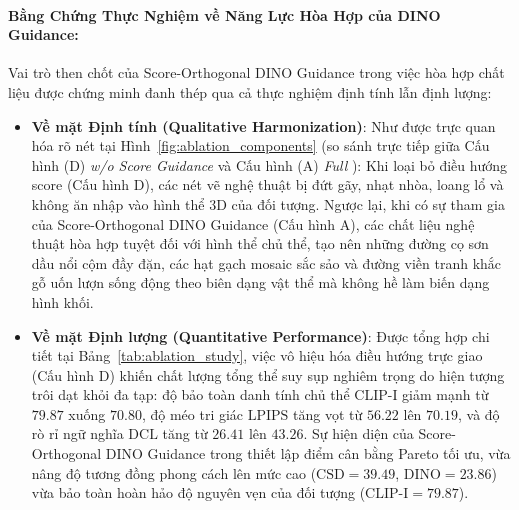 \documentclass[runningheads]{llncs}
\begin{document}
\paragraph{Bằng Chứng Thực Nghiệm về Năng Lực Hòa Hợp của DINO Guidance:}
Vai trò then chốt của Score-Orthogonal DINO Guidance trong việc hòa hợp chất liệu được chứng minh đanh thép qua cả thực nghiệm định tính lẫn định lượng:
\begin{itemize}
    \item \textbf{Về mặt Định tính (Qualitative Harmonization)}: Như được trực quan hóa rõ nét tại Hình~\ref{fig:ablation_components} (so sánh trực tiếp giữa Cấu hình (D) \textit{w/o Score Guidance} và Cấu hình (A) \textit{Full \method}): Khi loại bỏ điều hướng score (Cấu hình D), các nét vẽ nghệ thuật bị đứt gãy, nhạt nhòa, loang lổ và không ăn nhập vào hình thể 3D của đối tượng. Ngược lại, khi có sự tham gia của Score-Orthogonal DINO Guidance (Cấu hình A), các chất liệu nghệ thuật hòa hợp tuyệt đối với hình thể chủ thể, tạo nên những đường cọ sơn dầu nổi cộm đầy đặn, các hạt gạch mosaic sắc sảo và đường viền tranh khắc gỗ uốn lượn sống động theo biên dạng vật thể mà không hề làm biến dạng hình khối.
    \item \textbf{Về mặt Định lượng (Quantitative Performance)}: Được tổng hợp chi tiết tại Bảng~\ref{tab:ablation_study}, việc vô hiệu hóa điều hướng trực giao (Cấu hình D) khiến chất lượng tổng thể suy sụp nghiêm trọng do hiện tượng trôi dạt khỏi đa tạp: độ bảo toàn danh tính chủ thể $\text{CLIP-I}$ giảm mạnh từ $79.87$ xuống $70.80$, độ méo tri giác $\text{LPIPS}$ tăng vọt từ $56.22$ lên $70.19$, và độ rò rỉ ngữ nghĩa $\text{DCL}$ tăng từ $26.41$ lên $43.26$. Sự hiện diện của Score-Orthogonal DINO Guidance trong \method thiết lập điểm cân bằng Pareto tối ưu, vừa nâng độ tương đồng phong cách lên mức cao ($\text{CSD} = 39.49$, $\text{DINO} = 23.86$) vừa bảo toàn hoàn hảo độ nguyên vẹn của đối tượng ($\text{CLIP-I} = 79.87$).
\end{itemize}
\end{document}
